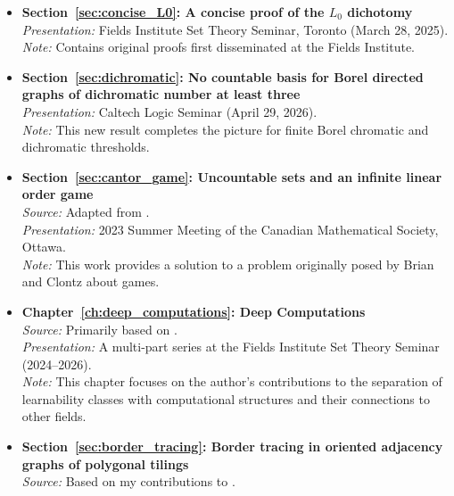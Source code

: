 
\begin{publications}
\begin{itemize}
    \item \textbf{Section~\ref{sec:concise_L0}: A concise proof of the $L_0$ dichotomy}
    \\ \textit{Presentation:} Fields Institute Set Theory Seminar, Toronto (March 28, 2025).
    \\ \textit{Note:} Contains original proofs first disseminated at the Fields Institute.

    \item \textbf{Section~\ref{sec:dichromatic}: No countable basis for Borel directed graphs of dichromatic number at least three}
    \\ \textit{Presentation:} Caltech Logic Seminar (April 29, 2026).
    \\ \textit{Note:} This new result completes the picture for finite Borel chromatic and dichromatic thresholds.

    \item \textbf{Section~\ref{sec:cantor_game}: Uncountable sets and an infinite linear order
game}
    \\ \textit{Source:} Adapted from \cite{MatosWiederholdSalvetti2025}.
    \\ \textit{Presentation:} 2023 Summer Meeting of the Canadian Mathematical Society, Ottawa.
    \\ \textit{Note:} This work provides a solution to a problem originally posed by Brian and Clontz about games.

    \item \textbf{Chapter~\ref{ch:deep_computations}: Deep Computations}
    \\ \textit{Source:} Primarily based on \cite{Duenezetal2026}.
    \\ \textit{Presentation:} A multi-part series at the Fields Institute Set Theory Seminar (2024--2026).
    \\ \textit{Note:} This chapter focuses on the author's contributions to the separation of learnability classes with computational structures and their connections to other fields.

    \item \textbf{Section~\ref{sec:border_tracing}: Border tracing in oriented adjacency graphs of polygonal tilings}
    \\ \textit{Source:} Based on my contributions to \cite{WiederholdMatosWiederhold2026}.


\end{itemize}
\end{publications}
